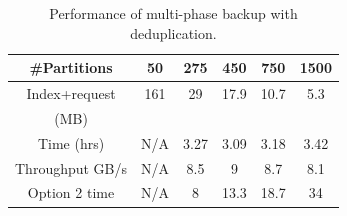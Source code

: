 
%


\begin{table}[hbt]
\caption{ Performance of multi-phase backup with deduplication.}
\begin{center}
\begin{tabular} {|c|c|c|c|c|c|}
\hline \#Partitions  & 50 & 275  &450 &  750 &  1500 \\
\hline Index+request & 161&  29 & 17.9 & 10.7 & 5.3 \\
  (MB)           &  &   &  & &  \\

\hline Time (hrs) & N/A&  3.27 & 3.09 & 3.18 & 3.42 \\
\hline Throughput GB/s& N/A&  8.5& 9 & 8.7 & 8.1 \\
\hline Option 2 time & N/A&  8& 13.3 & 18.7 & 34 \\
\hline
\end{tabular}
\end{center}
\label{tab:overall}
\end{table}

%

